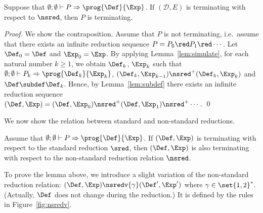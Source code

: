 \begin{lemma}  \label{lem:infinitechain}
    Suppose that \( \emptyset; \emptyset \vdash P \Rightarrow \prog{\Def}{\Exp} \).
    If \( (\mathcal{D}, E) \) is terminating with respect to $\nsred$, then \( P \) is terminating.
\end{lemma}
\begin{proof}
    We show the contraposition.
    Assume that \( P \) is not terminating, i.e.~assume that there exists an infinite reduction sequence $P = P_0 \red P_1 \red \cdots$.
    Let \( \Def_0 = \Def \) and \( \Exp_0 = \Exp \).
    By applying Lemma~\ref{lem:simulate}, for each natural number \( k \ge 1 \), we obtain \( \Def_k \), \( \Exp_k \) such that \( \emptyset; \emptyset \vdash P_k \Rightarrow
    \prog{\Def_k}{\Exp_k} \), \( (\Def_{k}, \Exp_{k-1}) \nsred^+ (\Def_{k}, \Exp_{k}) \) and \( \Def \subdef \Def_k \).
    Hence, by Lemma~\ref{lem:subdef} there exists an infinite reduction sequence
    $(\Def, \Exp) = (\Def, \Exp_0)\allowbreak \nsred^+ (\Def, \Exp_1) \nsred^+ \cdots$.
    \qed
\end{proof}

We now show the relation between standard and non-standard reductions.
\begin{lemma}  \label{lem:konig}
    Assume that $\emptyset; \emptyset \vdash P \Rightarrow \prog{\Def}{\Exp}$.
    If \( (\Def, \Exp) \) is terminating with respect to the standard reduction \( \sred \), then \( (\Def, \Exp)\) is also terminating with respect to the non-standard reduction relation \( \nsred \).
\end{lemma}

To prove the lemma above, we introduce a slight variation of the
non-standard reduction relation:
\((\Def,\Exp) \nsredv{\gamma} (\Def',\Exp')\) where
\(\gamma\in \set{1,2}^*\). (Actually, \(\Def\) does not change during the reduction.)
It is defined by the rules in Figure~\ref{fig:nsredv}.

